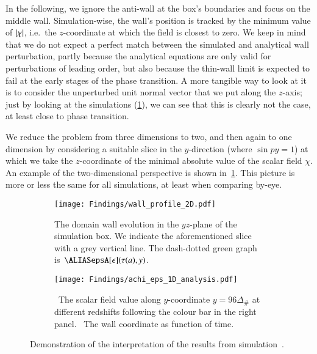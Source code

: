 




In the following, we ignore the anti-wall at the box's boundaries and focus on the middle wall.
Simulation-wise, the wall's position is tracked by the minimum value of $\abs{\chi}$, i.e.~the $z$-coordinate at which the field is closest to zero. %
We keep in mind that we do not expect a perfect match between the simulated and analytical wall perturbation, partly because the analytical equations are only valid for perturbations of leading order, but also because the thin-wall limit is expected to fail at the early stages of the phase transition. A more tangible way to look at it is to consider the unperturbed unit normal vector that we put along the $z$-axis; just by looking at the simulations (\cref{fig:results:epsilon:wall_profile_2D}), we can see that this is clearly not the case, at least close to phase transition.


We reduce the problem from three dimensions to two, and then again to one dimension by considering a suitable slice in the $y$-direction %
(where $\sin{py} =1$) %
at which we take the $z$-coordinate of the minimal absolute value of the scalar field $\chi$. An example of the two-dimensional perspective is shown in~\cref{fig:results:epsilon:wall_profile_2D}. This picture is more or less the same for all simulations, at least when comparing by-eye. 

\begin{figure}[ht]
    \centering
    \begin{subfigure}[b]{\linewidth}
        \centering
        \texttt{[image: Findings/wall\_profile\_2D.pdf]}
        \caption{The domain wall evolution in the $yz$-plane of the simulation box. We indicate the aforementioned slice with a grey vertical line. The dash-dotted green graph is~$\epsA[\epsilon](\tau(a), y)$.}
        \label{fig:results:epsilon:wall_profile_2D}
    \end{subfigure}
    \hfill
    \begin{subfigure}[b]{\linewidth}
        \centering
        \texttt{[image: Findings/achi\_eps\_1D\_analysis.pdf]}
        \caption{~The scalar field value along $y$-coordinate $y=96\Delta_\#$ at different redshifts following the colour bar in the right panel. ~The wall coordinate as function of time.}
        \label{fig:results:epsilon:achi_eps_1D_analysis}
    \end{subfigure}
    \caption{Demonstration of the interpretation of the results from simulation~.}
    \label{fig:results:epsilon:from_achi_to_epsilon}
\end{figure}



